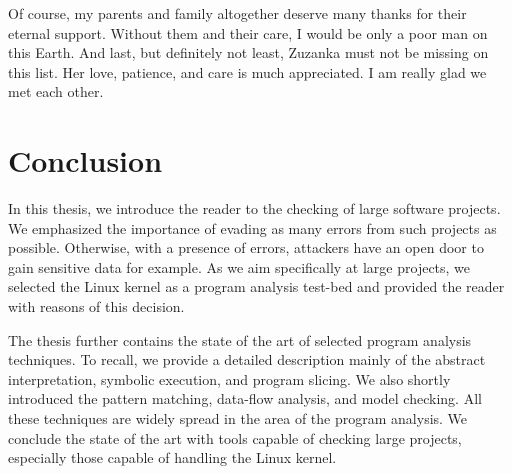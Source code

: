 \documentclass[11pt,a4paper]{book}
\begin{document}
Of course, my parents and family altogether deserve many thanks for their
eternal support. Without them and their care, I would be only a poor man on
this Earth. And last, but definitely not least, Zuzanka must not be missing on
this list. Her love, patience, and care is much appreciated. I am really glad
we met each other.

\clearpage

\tableofcontents

\clearpage

\mainmatter
\pagestyle{headings}








\clearpage
\chapter{Conclusion}
In this thesis, we introduce the reader to the checking of large software
projects. We emphasized the importance of evading as many errors from such
projects as possible. Otherwise, with a presence of errors, attackers have an
open door to gain sensitive data for example. As we aim specifically at large
projects, we selected the Linux kernel as a program analysis test-bed and
provided the reader with reasons of this decision.

The thesis further contains the state of the art of selected program analysis
techniques.  To recall, we provide a detailed description mainly of the
abstract interpretation, symbolic execution, and program slicing. We also
shortly introduced the pattern matching, data-flow analysis, and model
checking. All these techniques are widely spread in the area of the program
analysis. We conclude the state of the art with tools capable of checking
large projects, especially those capable of handling the Linux kernel.
\end{document}
